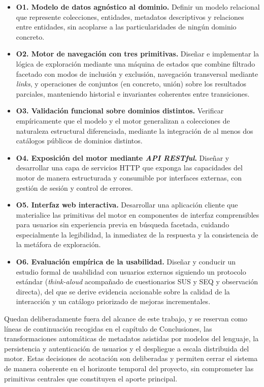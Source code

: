 \begin{itemize}
\item \textbf{O1. Modelo de datos agnóstico al dominio.} Definir un modelo relacional que
represente colecciones, entidades, metadatos descriptivos y relaciones entre entidades, sin
acoplarse a las particularidades de ningún dominio concreto.

\item \textbf{O2. Motor de navegación con tres primitivas.} Diseñar e implementar la lógica de
exploración mediante una máquina de estados que combine filtrado facetado con modos de inclusión
y exclusión, navegación transversal mediante \textit{links}, y operaciones de conjuntos (en
concreto, unión) sobre los resultados parciales, manteniendo historial e invariantes coherentes
entre transiciones.

\item \textbf{O3. Validación funcional sobre dominios distintos.} Verificar empíricamente que el
modelo y el motor generalizan a colecciones de naturaleza estructural diferenciada, mediante la
integración de al menos dos catálogos públicos de dominios distintos.

\item \textbf{O4. Exposición del motor mediante \textit{API RESTful}.} Diseñar y desarrollar una
capa de servicios HTTP que exponga las capacidades del motor de manera estructurada y consumible
por interfaces externas, con gestión de sesión y control de errores.

\item \textbf{O5. Interfaz web interactiva.} Desarrollar una aplicación cliente que materialice
las primitivas del motor en componentes de interfaz comprensibles para usuarios sin experiencia
previa en búsqueda facetada, cuidando especialmente la legibilidad, la inmediatez de la
respuesta y la consistencia de la metáfora de exploración.

\item \textbf{O6. Evaluación empírica de la usabilidad.} Diseñar y conducir un estudio formal
de usabilidad con usuarios externos siguiendo un protocolo estándar (\textit{think-aloud}
acompañado de cuestionarios SUS y SEQ y observación directa), del que se derive evidencia
accionable sobre la calidad de la interacción y un catálogo priorizado de mejoras incrementales.
\end{itemize}

Quedan deliberadamente fuera del alcance de este trabajo, y se reservan como líneas de
continuación recogidas en el capítulo de Conclusiones, las transformaciones automáticas de
metadatos asistidas por modelos del lenguaje, la persistencia y autenticación de usuarios y el
despliegue a escala distribuida del motor. Estas decisiones de acotación son deliberadas y
permiten cerrar el sistema de manera coherente en el horizonte temporal del proyecto, sin
comprometer las primitivas centrales que constituyen el aporte principal.

